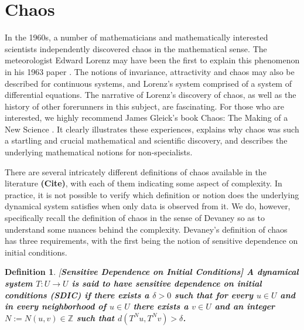 \documentclass[a4paper,12pt,twoside]{report}
\newtheorem{Definition}{Definition}[]
\begin{document}

\section{Chaos}

In the 1960s, a number of mathematicians and mathematically interested scientists independently discovered chaos in the mathematical sense. The meteorologist Edward Lorenz may have been the first to explain this phenomenon in his 1963 paper \cite{lorenz1963deterministic}. The notions of invariance, attractivity and chaos may also be described for continuous systems, and Lorenz's system comprised of a system of differential equations. The narrative of Lorenz's discovery of chaos, as well as the history of other forerunners in this subject, are fascinating. For those who are interested, we highly recommend James Gleick's book Chaos: The Making of a New Science \cite{gleick2008chaos}. It clearly illustrates these experiences, explains why chaos was such a startling and crucial mathematical and scientific discovery, and describes the underlying mathematical notions for non-specialists.

There are several intricately different definitions of chaos available in the literature \textbf{(Cite)}, with each of them indicating some aspect of complexity.
In practice, it is not possible to verify which definition or notion does the underlying dynamical system satisfies when only data is observed from it. We do, however, specifically recall the definition of chaos in the sense of Devaney \cite{devaney2018introduction,de2013elements} so as to understand some nuances behind the complexity. Devaney's definition of chaos has three requirements, with the first being the notion  of sensitive dependence on initial conditions. 

\begin{Definition}\rm
  [\bf {Sensitive Dependence on Initial Conditions}]\label{Dfn_SDIC}\rm
A dynamical system $T: U \to U$ is said to have sensitive dependence on initial conditions (SDIC) if there exists a $\delta > 0$ such that for every $u \in U$ and in every neighborhood of $u \in U$ there exists a $v\in{U}$ and an integer $N:=N{(u,v)}\in\mathbb{Z}$ such that $d(T^Nu,T^Nv)>\delta$. 	
\end{Definition}
\end{document}

